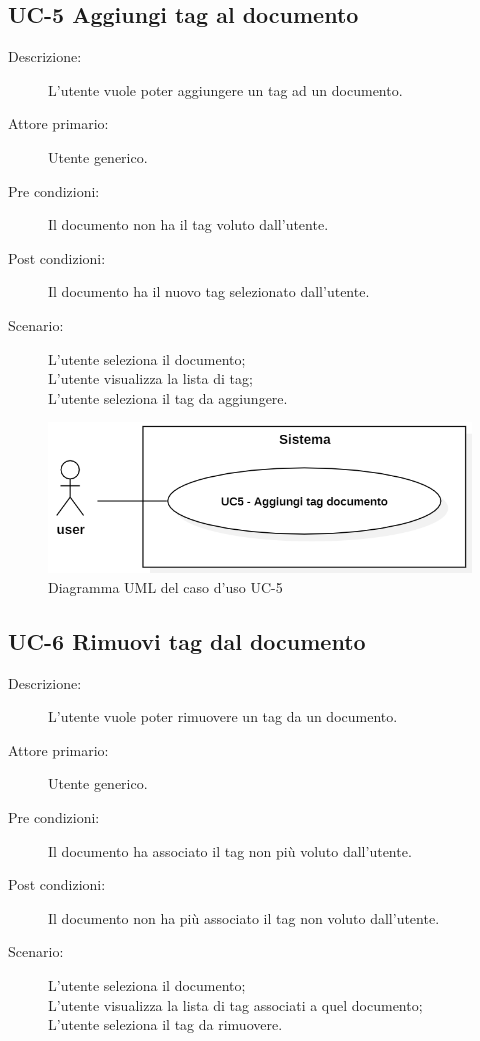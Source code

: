 \subsection{UC-5 Aggiungi tag al documento}
\begin{description}
    \item[Descrizione:] L’utente vuole poter aggiungere un tag ad un documento.
    \item[Attore primario:] Utente generico.
    \item[Pre condizioni:] Il documento non ha il tag voluto dall’utente.
    \item[Post condizioni:] Il documento ha il nuovo tag selezionato dall’utente.
    \item[Scenario:] L’utente seleziona il documento;\\L’utente visualizza la lista di tag;\\L’utente seleziona il tag da aggiungere.
\end{description}

\begin{figure}[H]
    \centering
    \includegraphics[width=0.8\linewidth]{UC5.PNG}
    \caption{Diagramma UML del caso d'uso UC-5}
    \label{fig:UC5}
\end{figure}

\subsection{UC-6 Rimuovi tag dal documento}
\begin{description}
    \item[Descrizione:] L’utente vuole poter rimuovere un tag da un documento.
    \item[Attore primario:] Utente generico.
    \item[Pre condizioni:] Il documento ha associato il tag non più voluto dall’utente.
    \item[Post condizioni:] Il documento non ha più associato il tag non voluto dall’utente.
    \item[Scenario:] L’utente seleziona il documento;\\L’utente visualizza la lista di tag associati a quel documento;\\L’utente seleziona il tag da rimuovere.
\end{description}

